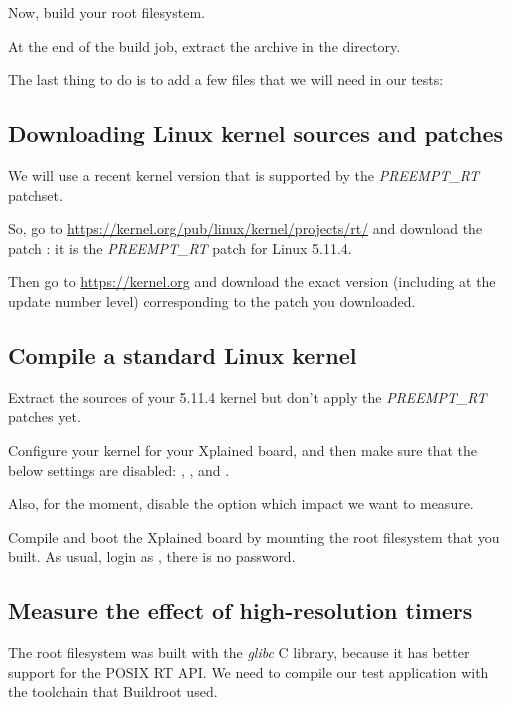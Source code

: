 Now, build your root filesystem.

At the end of the build job, extract the
 archive in the 
directory.

The last thing to do is to add a few files that we will need in our
tests:


\subsection{Downloading Linux kernel sources and patches}

We will use a recent kernel version that is supported by the {\em
  PREEMPT\_RT} patchset.

So, go to \url{https://kernel.org/pub/linux/kernel/projects/rt/} and
download the patch : it is the {\em
  PREEMPT\_RT} patch for Linux 5.11.4.

Then go to \url{https://kernel.org} and download the exact version
(including at the update number level) corresponding to the patch you
downloaded.

\subsection{Compile a standard Linux kernel}

Extract the sources of your 5.11.4 kernel but don't apply the {\em
  PREEMPT\_RT} patches yet.

Configure your kernel for your Xplained board, and then make sure
that the below settings are disabled:
, ,
 and .

Also, for the moment, disable the 
option which impact we want to measure.

Compile and boot the Xplained board by mounting the root filesystem that you
built. As usual, login as , there is no password.

\subsection{Measure the effect of high-resolution timers}

The root filesystem was built with the {\em glibc} C library, because
it has better support for the POSIX RT API. We need to compile our
test application with the toolchain that Buildroot used.

